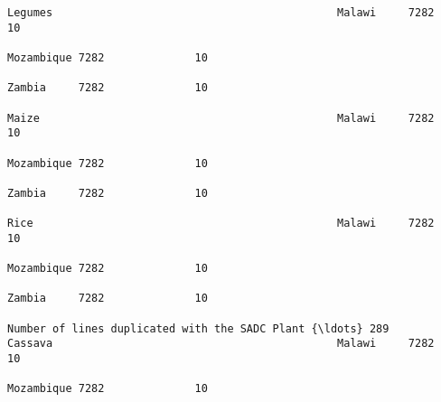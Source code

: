 \documentclass[11pt]{article}
\begin{document}
\begin{Verbatim}[commandchars=\\\{\}]
                                                                                                                                                              Legumes                                            Malawi     7282              10  
                                                                                                                                                                                                                 Mozambique 7282              10  
                                                                                                                                                                                                                 Zambia     7282              10  
                                                                                                                                                              Maize                                              Malawi     7282              10  
                                                                                                                                                                                                                 Mozambique 7282              10  
                                                                                                                                                                                                                 Zambia     7282              10  
                                                                                                                                                              Rice                                               Malawi     7282              10  
                                                                                                                                                                                                                 Mozambique 7282              10  
                                                                                                                                                                                                                 Zambia     7282              10  
                                                                         Number of lines duplicated with the SADC Plant {\ldots} 289                               Cassava                                            Malawi     7282              10  
                                                                                                                                                                                                                 Mozambique 7282              10  

\end{Verbatim}
\end{document}
